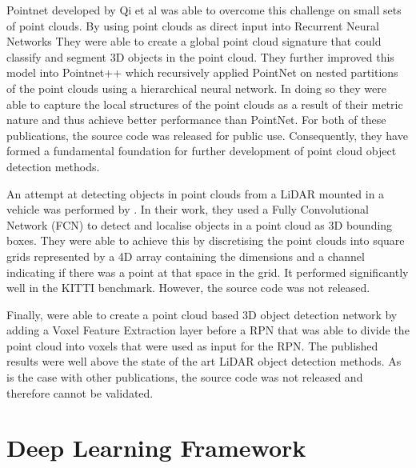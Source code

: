 Pointnet\cite{qi2017pointnet} developed by Qi et al was able to overcome this challenge on small sets of point clouds. By using point clouds as direct input into Recurrent Neural Networks\cite{medsker2001recurrent} They were able to create a global point cloud signature that could classify and segment 3D objects in the point cloud. They further improved this model into Pointnet++\cite{qi2017pointnet++} which recursively applied PointNet on nested partitions of the point clouds using a hierarchical neural network. In doing so they were able to capture the local structures of the point clouds as a result of their metric nature and thus achieve better performance than PointNet. For both of these publications, the source code was released for public use. Consequently, they have formed a fundamental foundation for further development of point cloud object detection methods.

An attempt at detecting objects in point clouds from a  LiDAR mounted in a vehicle was performed by \cite{li20163d}. In their work, they used a Fully Convolutional Network (FCN) to detect and localise objects in a point cloud as 3D bounding boxes. They were able to achieve this by discretising the point clouds into square grids represented by a 4D array containing the dimensions and a channel indicating if there was a point at that space in the grid. It performed significantly well in the KITTI benchmark. However, the source code was not released. 

Finally, \cite{zhou2017voxelnet}  were able to create a point cloud based 3D object detection network by adding a Voxel Feature Extraction layer before a RPN that was able to divide the point cloud into voxels that were used as input for the RPN. The published results were well above the state of the art LiDAR object detection methods. As is the case with other publications, the source code was not released and therefore cannot be validated.  

\section{Deep Learning Framework}

